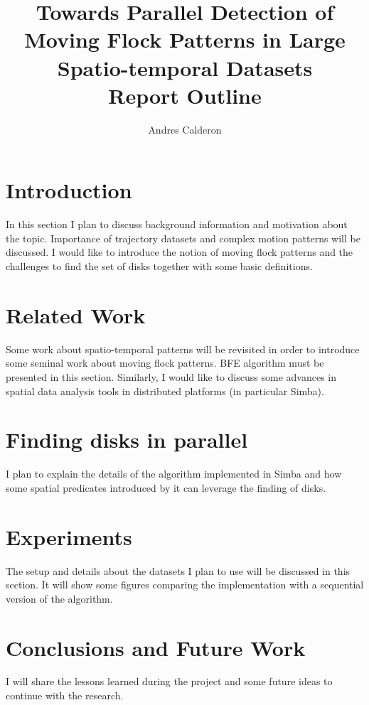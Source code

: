 \documentclass[12pt]{scrartcl}
\title{Towards Parallel Detection of Moving Flock Patterns in Large Spatio-temporal Datasets\\ \normalsize{Report Outline}}
\author{Andres Calderon}
\begin{document}
\maketitle
 
\section{Introduction}
In this section I plan to discuss background information and motivation about the topic.  Importance of trajectory datasets and complex motion patterns will be discussed.  I would like to introduce the notion of moving flock patterns and the challenges to find the set of disks together with some basic definitions.

\section{Related Work}
Some work about spatio-temporal patterns will be revisited in order to introduce some seminal work about moving flock patterns.  BFE algorithm must be presented in this section.  Similarly, I would like to discuss some advances in spatial data analysis tools in distributed platforms (in particular Simba).

\section{Finding disks in parallel}
I plan to explain the details of the algorithm implemented in Simba and how some spatial predicates introduced by it can leverage the finding of disks.

\section{Experiments}
The setup and details about the datasets I plan to use will be discussed in this section.  It will show some figures comparing the implementation with a sequential version of the algorithm.

\section{Conclusions and Future Work}
I will share the lessons learned during the project and some future ideas to continue with the research.

% 
% 
\end{document}
